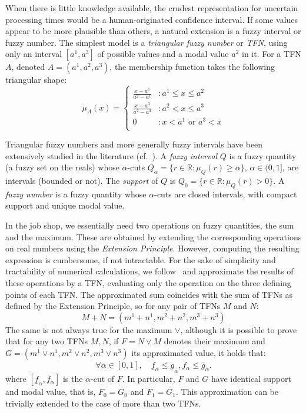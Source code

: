 \documentclass[letterpaper]{article}
\begin{document}
When there is little knowledge available, the crudest representation for uncertain processing times would be a human-originated confidence interval. If some values appear to be more plausible than others, a natural extension is a fuzzy interval or fuzzy number. The simplest model is a \emph{triangular fuzzy number} or \emph{TFN}, using only an interval $[a^1,a^3]$ of possible values and a modal value $a^2$ in it. For a TFN $A$, denoted $A=(a^1, a^2, a^3)$, the membership function takes the following triangular shape:
\begin{equation}\label{eqTFNmembership}
\mu_A(x)=\begin{cases}

\frac{x-a^1}{a^2-a^1}&: a^1 \leq x \leq a^2\\
\frac{x-a^3}{a^2-a^3}&: a^2 < x \leq a^3\\
0 &: x<a^1 \text{ or } a^3 < x\\
\end{cases}
\end{equation}

Triangular fuzzy numbers and more generally fuzzy intervals have been extensively studied in the literature (cf.~\cite{Dubois1988}). A \emph{fuzzy interval} $Q$ is a fuzzy quantity (a fuzzy set on the reals) whose $\alpha$-cuts $Q_\alpha=\{r \in \mathbb{R}: \mu_Q(r) \geq \alpha\}$, $\alpha \in (0,1]$, are intervals (bounded or not). The \emph{support} of $Q$ is $Q_0=\{r \in \mathbb{R}: \mu_Q(r)>0\}$. A \emph{fuzzy number} is a fuzzy quantity whose $\alpha$-cuts are closed intervals, with compact support and unique modal value.

In the job shop, we essentially need two operations on fuzzy quantities, the sum and the maximum. These are obtained by extending the corresponding operations on real numbers using the \emph{Extension Principle}. However, computing the resulting expression is cumbersome, if not intractable. For the sake of simplicity and tractability of numerical calculations, we follow~\cite{Fortemps1997} and approximate the results of these operations by a TFN, evaluating only the operation on the three defining points of each TFN. The approximated sum coincides with the sum of TFNs as defined by the Extension Principle, so for any pair of TFNs $M$ and $N$:
\begin{equation}
M+N=(m^1+n^1, m^2+n^2, m^3+n^3)
\end{equation}
The same is not always true for the maximum $\vee$, although it is possible to prove that for any two TFNs $M,N$, if $F=N \vee M$ denotes their maximum and $G=(m^1\vee n^1, m^2 \vee n^2, m^3 \vee n^3)$ its approximated value, it holds that:
\begin{equation}
\forall \alpha \in [0,1], \quad \underline{f}_\alpha \leq \underline{g}_\alpha, \overline{f}_\alpha \leq \overline{g}_\alpha.
\end{equation}
where $[\underline{f}_\alpha, \overline{f}_\alpha]$ is the $\alpha$-cut of $F$. In particular, $F$ and $G$ have identical support and modal value, that is, $F_0=G_0$ and $F_1=G_1$. This approximation can be trivially extended to the case of more than two TFNs.
\end{document}
